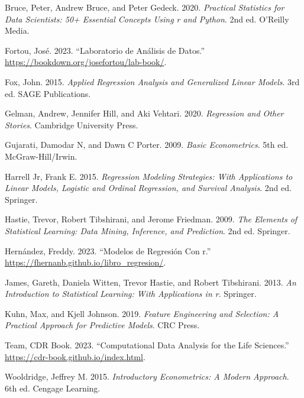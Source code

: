 \documentclass[
  oneside]{book}
\newlength{\cslhangindent}
\newenvironment{CSLReferences}[2] %
 {\begin{list}{}{%
  \setlength{\itemindent}{0pt}
  \setlength{\leftmargin}{0pt}
  \setlength{\parsep}{0pt}
  \ifodd #1
   \setlength{\leftmargin}{\cslhangindent}
   \setlength{\itemindent}{-1\cslhangindent}
  \fi
  \setlength{\itemsep}{#2\baselineskip}}}
 {\end{list}}
\begin{document}
\protect{}\label{refs}
\begin{CSLReferences}{1}{1}
Bruce, Peter, Andrew Bruce, and Peter Gedeck. 2020. \emph{Practical Statistics for Data Scientists: 50+ Essential Concepts Using r and Python}. 2nd ed. O'Reilly Media.

Fortou, José. 2023. {``Laboratorio de Análisis de Datos.''} \url{https://bookdown.org/josefortou/lab-book/}.

Fox, John. 2015. \emph{Applied Regression Analysis and Generalized Linear Models}. 3rd ed. SAGE Publications.

Gelman, Andrew, Jennifer Hill, and Aki Vehtari. 2020. \emph{Regression and Other Stories}. Cambridge University Press.

Gujarati, Damodar N, and Dawn C Porter. 2009. \emph{Basic Econometrics}. 5th ed. McGraw-Hill/Irwin.

Harrell Jr, Frank E. 2015. \emph{Regression Modeling Strategies: With Applications to Linear Models, Logistic and Ordinal Regression, and Survival Analysis}. 2nd ed. Springer.

Hastie, Trevor, Robert Tibshirani, and Jerome Friedman. 2009. \emph{The Elements of Statistical Learning: Data Mining, Inference, and Prediction}. 2nd ed. Springer.

Hernández, Freddy. 2023. {``Modelos de Regresión Con r.''} \url{https://fhernanb.github.io/libro_regresion/}.

James, Gareth, Daniela Witten, Trevor Hastie, and Robert Tibshirani. 2013. \emph{An Introduction to Statistical Learning: With Applications in r}. Springer.

Kuhn, Max, and Kjell Johnson. 2019. \emph{Feature Engineering and Selection: A Practical Approach for Predictive Models}. CRC Press.

Team, CDR Book. 2023. {``Computational Data Analysis for the Life Sciences.''} \url{https://cdr-book.github.io/index.html}.

Wooldridge, Jeffrey M. 2015. \emph{Introductory Econometrics: A Modern Approach}. 6th ed. Cengage Learning.

\end{CSLReferences}
\end{document}
